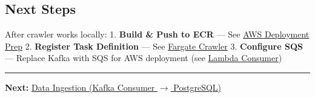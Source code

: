 \hypertarget{next-steps}{%
\subsection{Next Steps}}

After crawler works locally: 1. \textbf{Build \& Push to ECR} --- See
\href{5.9-AWS-Deploy/}{AWS Deployment Prep} 2. \textbf{Register Task
Definition} --- See \href{5.10-Fargate-Crawler/}{Fargate Crawler} 3.
\textbf{Configure SQS} --- Replace Kafka with SQS for AWS deployment
(see \href{5.11-Lambda-Consumer/}{Lambda Consumer})

\begin{center}\rule{0.5\linewidth}{0.5pt}\end{center}

\textbf{Next:} \href{5.6-Ingestion/}{Data Ingestion (Kafka Consumer
\(\rightarrow\) PostgreSQL)}
